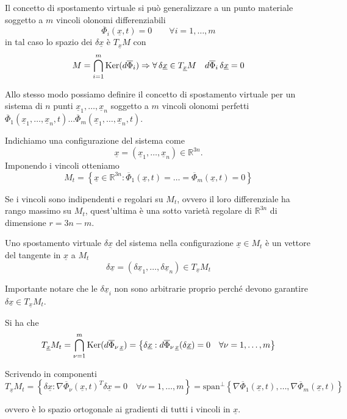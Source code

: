 \begin{oss}{}
Il concetto di spostamento virtuale si può generalizzare a un punto materiale soggetto a \(m\) vincoli olonomi differenziabili
\[
\overline{\Phi}_i(\underline{x},t)=0
\qquad
\forall i=1,\ldots,m
\]
in tal caso lo spazio dei \(\delta \underline{x}\) è \(T_{\underline{x}}M\) con
\[
M=\bigcap_{i=1}^{m}\operatorname{Ker}(d\overline{\Phi}_i)\Rightarrow \forall\,\delta \underline{x}\in T_{\underline{x}}M \quad d\overline{\Phi}_i\,\delta \underline{x}=0
\]

Allo stesso modo possiamo definire il concetto di spostamento virtuale per un sistema di \(n\) punti \(\underline{x}_1,\ldots,\underline{x}_n\) soggetto a \(m\) vincoli olonomi perfetti \(\overline{\Phi}_1(\underline{x}_1,\ldots,\underline{x}_n,t)\ldots \overline{\Phi}_m(\underline{x}_1,\ldots,\underline{x}_n,t)\).

Indichiamo una configurazione del sistema come
\[
\underline{x}=(\underline{x}_1,\ldots,\underline{x}_n)\in\mathbb{R}^{3n}.
\]
Imponendo i vincoli otteniamo
\[
M_t=\left\{\underline{x}\in\mathbb{R}^{3n}:\overline{\Phi}_1(\underline{x},t)=\ldots=\overline{\Phi}_m(\underline{x},t)=0\right\}
\]

Se i vincoli sono indipendenti e regolari su \(M_t\), ovvero il loro differenziale ha rango massimo su \(M_t\), quest'ultima è una sotto varietà regolare di \(\mathbb{R}^{3n}\) di dimensione \(r=3n-m\).

Uno spostamento virtuale \(\delta \underline{x}\) del sistema nella configurazione \(\underline{x}\in M_t\) è un vettore del tangente in \(\underline{x}\) a \(M_t\)
\[
\delta \underline{x}=(\delta \underline{x}_1,\ldots,\delta \underline{x}_n)\in T_{\underline{x}}M_t
\]

Importante notare che le \(\delta \underline{x}_i\) non sono arbitrarie proprio perché devono garantire \(\delta \underline{x}\in T_{\underline{x}}M_t\).

Si ha che
\[
T_{\underline{x}}M_t=\bigcap_{\nu=1}^{m}\operatorname{Ker}(d\overline{\Phi}_{\nu\,\underline{x}})=\left\{\delta \underline{x}:d\overline{\Phi}_{\nu\,\underline{x}}(\delta \underline{x})=0 \quad \forall \nu=1,\ldots,m\right\}
\]

Scrivendo in componenti
\[
T_{\underline{x}}M_t=\left\{\delta \underline{x}:\nabla \overline{\Phi}_\nu(\underline{x},t)^T\delta \underline{x}=0 \quad \forall \nu=1,\ldots,m\right\}=\mathrm{span}^{\perp}\left\{\nabla \overline{\Phi}_1(\underline{x},t),\ldots,\nabla \overline{\Phi}_m(\underline{x},t)\right\}
\]

ovvero è lo spazio ortogonale ai gradienti di tutti i vincoli in \(\underline{x}\).
\end{oss}

